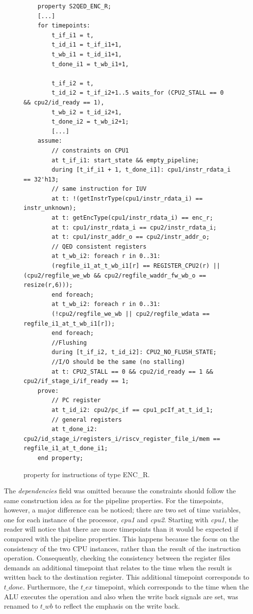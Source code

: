 \begin{figure}[htb!]
    \begin{lstlisting}
    property S2QED_ENC_R;
    [...]
    for timepoints:
        t_if_i1 = t,
        t_id_i1 = t_if_i1+1,
        t_wb_i1 = t_id_i1+1,
        t_done_i1 = t_wb_i1+1,
        
        t_if_i2 = t,
        t_id_i2 = t_if_i2+1..5 waits_for (CPU2_STALL == 0 && cpu2/id_ready == 1),
        t_wb_i2 = t_id_i2+1,
        t_done_i2 = t_wb_i2+1;
        [...]
    assume:
        // constraints on CPU1
        at t_if_i1: start_state && empty_pipeline;
        during [t_if_i1 + 1, t_done_i1]: cpu1/instr_rdata_i == 32'h13;
        // same instruction for IUV
        at t: !(getInstrType(cpu1/instr_rdata_i) == instr_unknown); 
        at t: getEncType(cpu1/instr_rdata_i) == enc_r;
        at t: cpu1/instr_rdata_i == cpu2/instr_rdata_i;
        at t: cpu1/instr_addr_o == cpu2/instr_addr_o;
        // QED consistent registers
        at t_wb_i2: foreach r in 0..31: 
        (regfile_i1_at_t_wb_i1[r] == REGISTER_CPU2(r) || (cpu2/regfile_we_wb && cpu2/regfile_waddr_fw_wb_o == resize(r,6))); 
        end foreach;
        at t_wb_i2: foreach r in 0..31: 
        (!cpu2/regfile_we_wb || cpu2/regfile_wdata == regfile_i1_at_t_wb_i1[r]); 
        end foreach;
        //Flushing
        during [t_if_i2, t_id_i2]: CPU2_NO_FLUSH_STATE;
        //I/O should be the same (no stalling)
        at t: CPU2_STALL == 0 && cpu2/id_ready == 1 && cpu2/if_stage_i/if_ready == 1;
    prove:
        // PC register
        at t_id_i2: cpu2/pc_if == cpu1_pcIf_at_t_id_1;
        // general registers
        at t_done_i2: cpu2/id_stage_i/registers_i/riscv_register_file_i/mem == regfile_i1_at_t_done_i1;
    end property;\end{lstlisting}
    \caption{\SSQED{} property for instructions of type ENC\_R.}
    \label{fig:ri5cy-enc-r-s2qed-ppt}
\end{figure}

The \textit{dependencies} field was omitted because the constraints should follow the same construction idea as for the pipeline properties. For the timepoints, however, a major difference can be noticed; there are two set of time variables, one for each instance of the processor, \textit{cpu1} and \textit{cpu2}. Starting with \textit{cpu1}, the reader will notice that there are more timepoints than it would be expected if compared with the pipeline properties. This happens because the \SSQED{} focus on the consistency of the two CPU instances, rather than the result of the instruction operation. Consequently, checking the consistency between the register files demands an additional timepoint that relates to the time when the result is written back to the destination register. This additional timepoint corresponds to $t\_done$. Furthermore, the $t\_ex$ timepoint, which corresponds to the time when the ALU executes the operation and also when the write back signals are set, was renamed to $t\_wb$ to reflect the emphasis on the write back.

